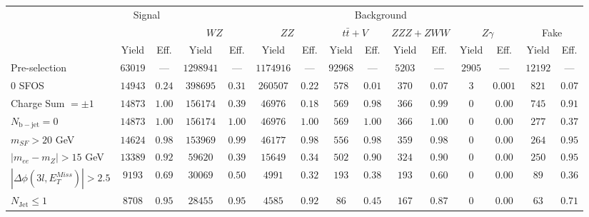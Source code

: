 \begin{tabular}{l||c|c||c|c||c|c||c|c||c|c||c|c||c|c}
\hline
 & \multicolumn{2}{c||}{Signal}       &  \multicolumn{12}{c}{Background}  \\
 & &  & \multicolumn{2}{c||}{$WZ$} & \multicolumn{2}{c||}{$ZZ$} & \multicolumn{2}{c||}{$t\bar{t}+V$} & \multicolumn{2}{c||}{$ZZZ+ZWW$} & \multicolumn{2}{c||}{$Z\gamma$} & \multicolumn{2}{c}{Fake} \\ 
 & Yield & Eff. & Yield & Eff. & Yield & Eff. & Yield & Eff. & Yield & Eff. & Yield & Eff. & Yield & Eff. \\
\hline\hline
Pre-selection &  $63019$ & --- &  $1298941$ & --- &  $1174916$ & --- &  $92968$ & --- &  $5203$ & --- &  $2905$ & --- &  $12192$ & --- \\
\hline
0 SFOS &  $14943$ &  $0.24$ &  $398695$ &  $0.31$ &  $260507$ &  $0.22$ &  $578$ &  $0.01$ &  $370$ &  $0.07$ &  $3$ &  $0.001$ &  $821$ &  $0.07$\\ 
\hline
Charge Sum $= \pm 1$ &  $14873$ &  $1.00$ &  $156174$ &  $0.39$ &  $46976$ &  $0.18$ &  $569$ &  $0.98$ &  $366$ &  $0.99$ &  $0$ &  $0.00$ &  $745$ &  $0.91$\\ 
\hline
$N_{\mathrm{b-jet}} = 0$ &  $14873$ &  $1.00$ &  $156174$ &  $1.00$ &  $46976$ &  $1.00$ &  $569$ &  $1.00$ &  $366$ &  $1.00$ &  $0$ &  $0.00$ &  $277$ &  $0.37$\\ 
\hline
$m_{SF} > 20$ GeV &  $14624$ &  $0.98$ &  $153969$ &  $0.99$ &  $46177$ &  $0.98$ &  $556$ &  $0.98$ &  $359$ &  $0.98$ &  $0$ &  $0.00$ &  $264$ &  $0.95$\\ 
\hline
$|m_{ee} - m_{Z}| > 15$ GeV &  $13389$ &  $0.92$ &  $59620$ &  $0.39$ &  $15649$ &  $0.34$ &  $502$ &  $0.90$ &  $324$ &  $0.90$ &  $0$ &  $0.00$ &  $250$ &  $0.95$\\ 
\hline
$|\Delta\phi(3l,E_{T}^{Miss})| > 2.5$ &  $9193$ &  $0.69$ &  $30069$ &  $0.50$ &  $4991$ &  $0.32$ &  $193$ &  $0.38$ &  $193$ &  $0.60$ &  $0$ &  $0.00$ &  $89$ &  $0.36$\\ 
\hline
$N_{\mathrm{Jet}} \leq 1$ &  $8708$ &  $0.95$ &  $28455$ &  $0.95$ &  $4585$ &  $0.92$ &  $86$ &  $0.45$ &  $167$ &  $0.87$ &  $0$ &  $0.00$ &  $63$ &  $0.71$\\ 
\hline
\end{tabular}
